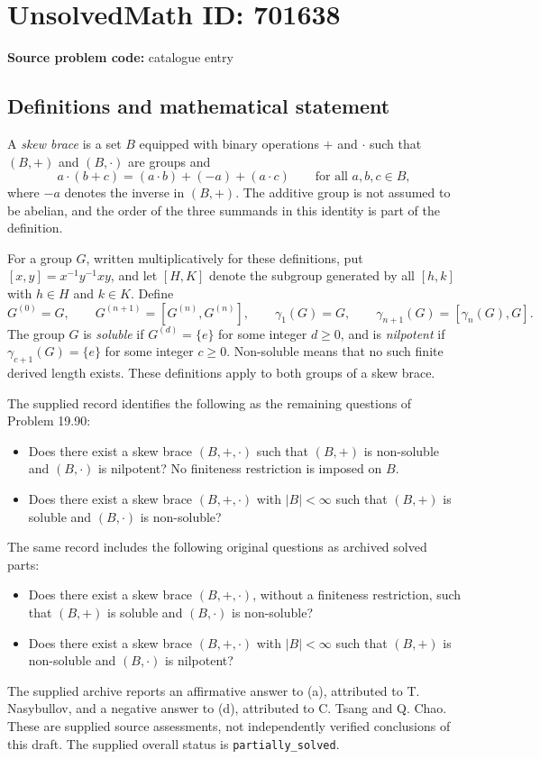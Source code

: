 \documentclass[11pt]{article}
\begin{document}
\section*{UnsolvedMath ID: 701638}
\textbf{Source problem code:} catalogue entry
\subsection{Definitions and mathematical statement}
A \emph{skew brace} is a set \(B\) equipped with binary operations \(+\) and \(\cdot\) such that \((B,+)\) and \((B,\cdot)\) are groups and
\[
 a\cdot(b+c)=(a\cdot b)+(-a)+(a\cdot c)
 \qquad\text{for all }a,b,c\in B,
\]
where \(-a\) denotes the inverse in \((B,+)\). The additive group is not assumed to be abelian, and the order of the three summands in this identity is part of the definition.

For a group \(G\), written multiplicatively for these definitions, put \([x,y]=x^{-1}y^{-1}xy\), and let \([H,K]\) denote the subgroup generated by all \([h,k]\) with \(h\in H\) and \(k\in K\). Define
\[
 G^{(0)}=G,\qquad G^{(n+1)}=[G^{(n)},G^{(n)}],
 \qquad
 \gamma_1(G)=G,\qquad \gamma_{n+1}(G)=[\gamma_n(G),G].
\]
The group \(G\) is \emph{soluble} if \(G^{(d)}=\{e\}\) for some integer \(d\geq0\), and is \emph{nilpotent} if \(\gamma_{c+1}(G)=\{e\}\) for some integer \(c\geq0\). Non-soluble means that no such finite derived length exists. These definitions apply to both groups of a skew brace.

The supplied record identifies the following as the remaining questions of Problem 19.90:
\begin{itemize}
\item[(b)] Does there exist a skew brace \((B,+,\cdot)\) such that \((B,+)\) is non-soluble and \((B,\cdot)\) is nilpotent? No finiteness restriction is imposed on \(B\).
\item[(c)] Does there exist a skew brace \((B,+,\cdot)\) with \(|B|<\infty\) such that \((B,+)\) is soluble and \((B,\cdot)\) is non-soluble?
\end{itemize}
The same record includes the following original questions as archived solved parts:
\begin{itemize}
\item[(a)] Does there exist a skew brace \((B,+,\cdot)\), without a finiteness restriction, such that \((B,+)\) is soluble and \((B,\cdot)\) is non-soluble?
\item[(d)] Does there exist a skew brace \((B,+,\cdot)\) with \(|B|<\infty\) such that \((B,+)\) is non-soluble and \((B,\cdot)\) is nilpotent?
\end{itemize}
The supplied archive reports an affirmative answer to (a), attributed to T. Nasybullov, and a negative answer to (d), attributed to C. Tsang and Q. Chao. These are supplied source assessments, not independently verified conclusions of this draft. The supplied overall status is \texttt{partially\_solved}.
\end{document}

